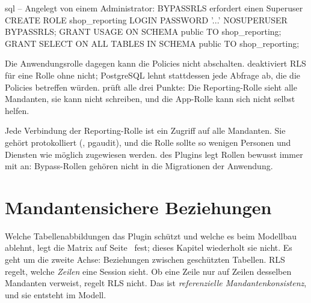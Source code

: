 \begin{sourcecode}{sql}
-- Angelegt von einem Administrator: BYPASSRLS erfordert einen Superuser
CREATE ROLE shop_reporting LOGIN PASSWORD '...' NOSUPERUSER BYPASSRLS;
GRANT USAGE ON SCHEMA public TO shop_reporting;
GRANT SELECT ON ALL TABLES IN SCHEMA public TO shop_reporting;
\end{sourcecode}

Die Anwendungsrolle dagegen kann die Policies nicht abschalten.  deaktiviert RLS für eine Rolle ohne 
nicht; PostgreSQL lehnt stattdessen jede Abfrage ab, die die Policies betreffen würden.
 prüft alle drei Punkte:
Die Reporting-Rolle sieht alle Mandanten, sie kann nicht schreiben, und die App-Rolle kann
sich nicht selbst helfen.

\begin{important}
  Jede Verbindung der Reporting-Rolle ist ein Zugriff auf alle Mandanten. Sie gehört
  protokolliert (, pgaudit), und die Rolle sollte so
  wenigen Personen und Diensten wie möglich zugewiesen werden.
   des Plugins legt Rollen bewusst
  immer mit  an: Bypass-Rollen gehören nicht in die Migrationen der
  Anwendung.
\end{important}

\chapter{Mandantensichere Beziehungen}\label{ch:tenant-safe-relationships}

Welche Tabellenabbildungen das Plugin schützt und welche es beim Modellbau ablehnt, legt die
Matrix auf Seite~\pageref{sec:supported-table-mappings} fest; dieses Kapitel wiederholt sie
nicht. Es geht um die zweite Achse: Beziehungen zwischen geschützten Tabellen. RLS regelt, welche
\emph{Zeilen} eine Session sieht. Ob eine Zeile nur auf Zeilen desselben Mandanten verweist,
regelt RLS nicht. Das ist \emph{referenzielle Mandantenkonsistenz}, und sie entsteht im Modell.

